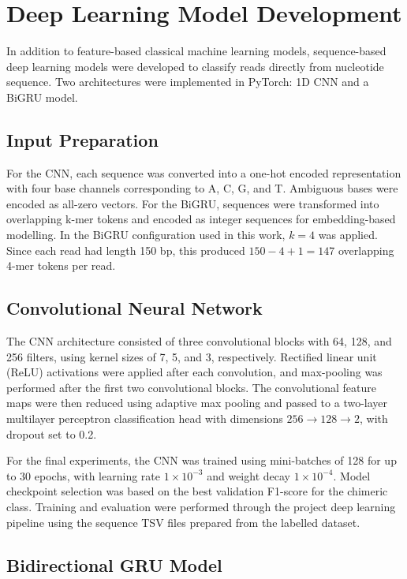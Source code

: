 \section{Deep Learning Model Development}

In addition to feature-based classical machine learning models, sequence-based deep learning models were developed to classify reads directly from nucleotide sequence. Two architectures were implemented in PyTorch: 1D CNN and a BiGRU model.

\subsection{Input Preparation}

For the CNN, each sequence was converted into a one-hot encoded representation with four base channels corresponding to A, C, G, and T. Ambiguous bases were encoded as all-zero vectors. For the BiGRU, sequences were transformed into overlapping k-mer tokens and encoded as integer sequences for embedding-based modelling. In the BiGRU configuration used in this work, \(k=4\) was applied. Since each read had length 150 bp, this produced \(150 - 4 + 1 = 147\) overlapping 4-mer tokens per read.

\subsection{Convolutional Neural Network}

The CNN architecture consisted of three convolutional blocks with 64, 128, and 256 filters, using kernel sizes of 7, 5, and 3, respectively. Rectified linear unit (ReLU) activations were applied after each convolution, and max-pooling was performed after the first two convolutional blocks. The convolutional feature maps were then reduced using adaptive max pooling and passed to a two-layer multilayer perceptron classification head with dimensions \(256 \rightarrow 128 \rightarrow 2\), with dropout set to 0.2.

For the final experiments, the CNN was trained using mini-batches of 128 for up to 30 epochs, with learning rate \(1\times10^{-3}\) and weight decay \(1\times10^{-4}\). Model checkpoint selection was based on the best validation F1-score for the chimeric class. Training and evaluation were performed through the project deep learning pipeline using the sequence TSV files prepared from the labelled dataset.

\subsection{Bidirectional GRU Model}

